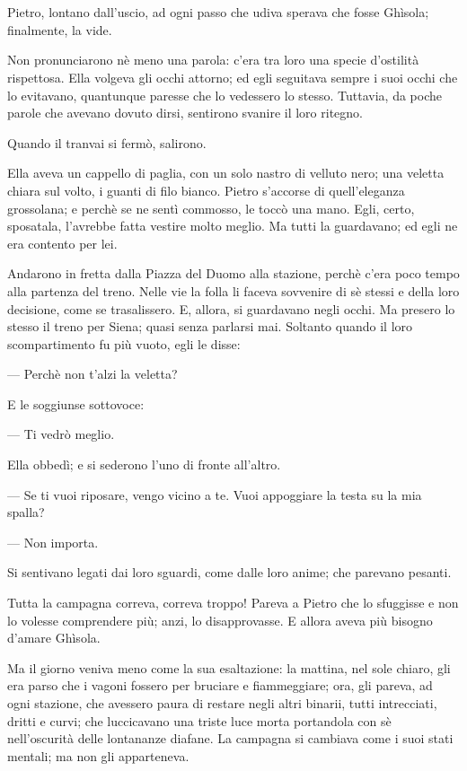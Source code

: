 \chapter{}

Pietro, lontano dall’uscio, ad ogni passo che udiva sperava che fosse Ghìsola; finalmente, la vide.

Non pronunciarono nè meno una parola: c’era tra loro una specie d’ostilità rispettosa. Ella volgeva gli occhi attorno; ed egli seguitava sempre i suoi occhi che lo evitavano, quantunque paresse che lo vedessero lo stesso. Tuttavia, da poche parole che avevano dovuto dirsi, sentirono svanire il loro ritegno.

Quando il tranvai si fermò, salirono.

Ella aveva un cappello di paglia, con un solo nastro di velluto nero; una veletta chiara sul volto, i guanti di filo bianco. Pietro s’accorse di quell’eleganza grossolana; e perchè se ne sentì commosso, le toccò una mano. Egli, certo, sposatala, l’avrebbe fatta vestire molto meglio. Ma tutti la guardavano; ed egli ne era contento per lei.

Andarono in fretta dalla Piazza del Duomo alla stazione, perchè c’era poco tempo alla partenza del treno. Nelle vie la folla li faceva sovvenire di sè stessi e della loro decisione, come se trasalissero. E, allora, si guardavano negli occhi. Ma presero lo stesso il treno per Siena; quasi senza parlarsi mai. Soltanto quando il loro scompartimento fu più vuoto, egli le disse:

— Perchè non t’alzi la veletta?

E le soggiunse sottovoce:

— Ti vedrò meglio.

Ella obbedì; e si sederono l’uno di fronte all’altro.

— Se ti vuoi riposare, vengo vicino a te. Vuoi appoggiare la testa su la mia spalla?

— Non importa.

Si sentivano legati dai loro sguardi, come dalle loro anime; che parevano pesanti.

Tutta la campagna correva, correva troppo! Pareva a Pietro che lo sfuggisse e non lo volesse comprendere più; anzi, lo disapprovasse. E allora aveva più bisogno d’amare Ghìsola.

Ma il giorno veniva meno come la sua esaltazione: la mattina, nel sole chiaro, gli era parso che i vagoni fossero per bruciare e fiammeggiare; ora, gli pareva, ad ogni stazione, che avessero paura di restare negli altri binarii, tutti intrecciati, dritti e curvi; che luccicavano una triste luce morta portandola con sè nell’oscurità delle lontananze diafane. La campagna si cambiava come i suoi stati mentali; ma non gli apparteneva.

